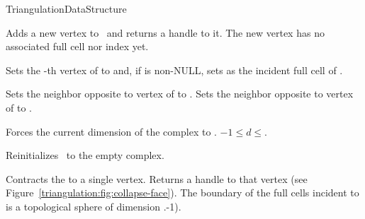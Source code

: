\begin{ccRefConcept}{TriangulationDataStructure}
\begin{ccAdvanced}
{Adds a new vertex to \ccVar\ and returns a handle to it. The new vertex has
no associated full cell nor index yet.}

{Sets the -th vertex of  to  and, if  is non-NULL,
sets  as the incident full cell of .}

{Sets the neighbor opposite to vertex  of   to
. Sets the neighbor opposite to vertex  of 
 to .}

 { Forces the current dimension
of the complex to . 
\ccPrecond $-1\leq d\leq$.}

\end{ccAdvanced}


{Reinitializes \ccVar\ to the empty complex.}

 {Contracts the
 to a single vertex. Returns a handle to that vertex
(see Figure~\ref{triangulation:fig:collapse-face}).
\ccPrecond
The boundary of the full cells incident to 
is a topological sphere of dimension
\ccVar.-1).
}


\end{ccRefConcept}
